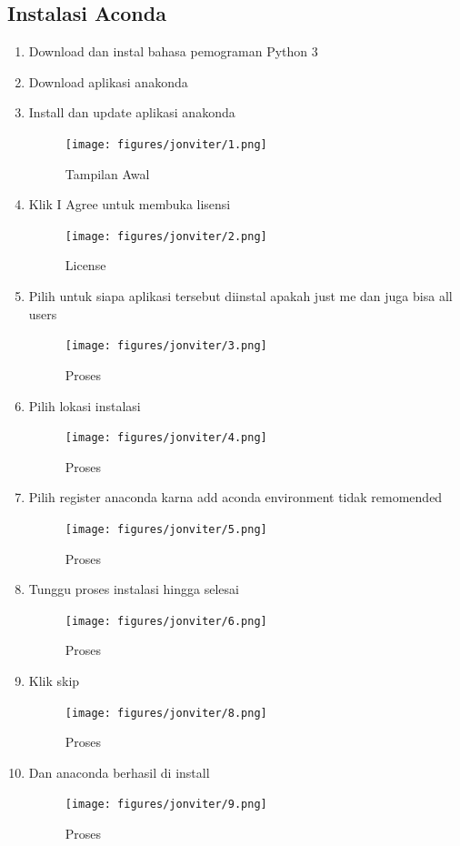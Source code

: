 \subsection{Instalasi Aconda}
\begin{enumerate}
\item Download dan instal bahasa pemograman Python 3
\item Download aplikasi anakonda
\item Install dan update aplikasi anakonda
 \begin{figure}[!htbp]
        \centering
        \texttt{[image: figures/jonviter/1.png]}
        \caption{Tampilan Awal}
        \label{awal}
        \end{figure}
    \item Klik I Agree untuk membuka lisensi
     \begin{figure}[!htbp]
        \centering
        \texttt{[image: figures/jonviter/2.png]}
        \caption{License}
        \label{awal}
        \end{figure}
    \item  Pilih untuk siapa aplikasi tersebut diinstal apakah just me dan juga bisa all users
     \begin{figure}[!htbp]
        \centering
        \texttt{[image: figures/jonviter/3.png]}
        \caption{Proses}
        \label{awal}
        \end{figure}
    \item  Pilih lokasi instalasi
    \begin{figure}[!htbp]
        \centering
        \texttt{[image: figures/jonviter/4.png]}
        \caption{Proses}
        \label{awal}
        \end{figure}
    \item Pilih register anaconda karna add aconda environment tidak remomended
    \begin{figure}[!htbp]
        \centering
        \texttt{[image: figures/jonviter/5.png]}
        \caption{Proses}
        \label{awal}
        \end{figure}
    \item Tunggu proses instalasi hingga selesai
    \begin{figure}[!htbp]
        \centering
        \texttt{[image: figures/jonviter/6.png]}
        \caption{Proses}
        \label{awal}
        \end{figure}
    \item Klik skip
    \begin{figure}[!htbp]
        \centering
        \texttt{[image: figures/jonviter/8.png]}
        \caption{Proses}
        \label{awal}
        \end{figure}
    \item  Dan anaconda berhasil di install
    \begin{figure}[!htbp]
        \centering
        \texttt{[image: figures/jonviter/9.png]}
        \caption{Proses}
        \label{awal}
        \end{figure}
\end{enumerate}

